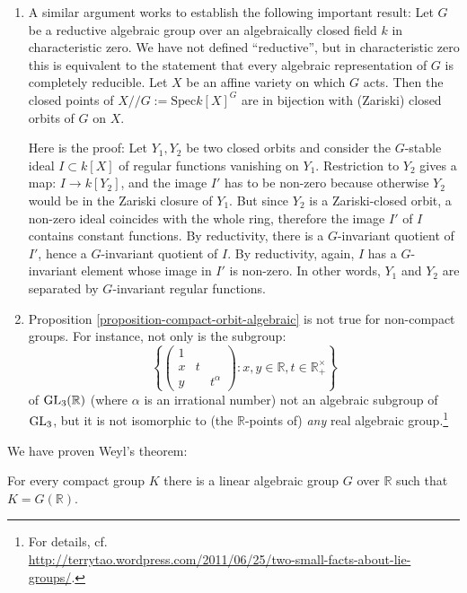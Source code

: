 \begin{remarks}
\begin{enumerate}
 \item A similar argument works to establish the following important result: Let $G$ be a reductive algebraic group over an algebraically closed field $k$ in characteristic zero. We have not defined ``reductive'', but in characteristic zero this is equivalent to the statement that every algebraic representation of $G$ is completely reducible. Let $X$ be an affine variety on which $G$ acts. Then the closed points of $X// G:=\text{Spec} k[X]^G$ are in bijection with (Zariski) closed orbits of $G$ on $X$.

Here is the proof: Let $Y_1, Y_2$ be two closed orbits and consider the $G$-stable ideal $I\subset k[X]$ of regular functions vanishing on $Y_1$. Restriction to $Y_2$ gives a map: $I\to k[Y_2]$, and the image $I'$ has to be non-zero because otherwise $Y_2$ would be in the Zariski closure of $Y_1$. But since $Y_2$ is a Zariski-closed orbit, a non-zero ideal coincides with the whole ring, therefore the image $I'$ of $I$ contains constant functions. By reductivity, there is a $G$-invariant quotient of $I'$, hence a $G$-invariant quotient of $I$. By reductivity, again, $I$ has a $G$-invariant element whose image in $I'$ is non-zero. In other words, $Y_1$ and $Y_2$ are separated by $G$-invariant regular functions.


\item Proposition \ref{proposition-compact-orbit-algebraic} is not true for non-compact groups. For instance, not only is the subgroup:
$$\left\{\left(\begin{array}{ccc} 1 \\ x & t \\ y && t^\alpha \end{array}\right): x,y\in \mathbb R, t\in \mathbb R_+^\times \right\}$$
of ${\rm GL}_3(\mathbb R)$ (where $\alpha$ is an irrational number) not an algebraic subgroup of ${\rm GL}_3$, but it is not isomorphic to (the $\mathbb R$-points of) \emph{any} real algebraic group.\footnote{For details, cf.\ \\ \url{http://terrytao.wordpress.com/2011/06/25/two-small-facts-about-lie-groups/}.}

\end{enumerate}

We have proven Weyl's theorem:

\begin{theorem}
 For every compact group $K$ there is a linear algebraic group $G$ over $\mathbb R$ such that $K = G(\mathbb R)$.
\end{theorem}


\end{remarks}
